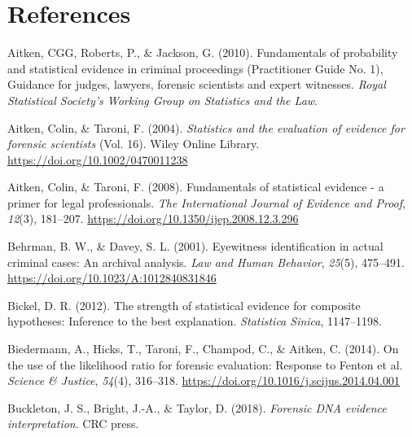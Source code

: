 \documentclass[
  letterpaper,
  DIV=11,
  numbers=noendperiod]{scrartcl}
\newlength{\cslhangindent}
\newlength{\cslentryspacingunit} %
\newenvironment{CSLReferences}[2] %
 {%
  \setlength{\parindent}{0pt}
  \ifodd #1
  \let\oldpar\par
  \def\par{\hangindent=\cslhangindent\oldpar}
  \fi
  \setlength{\parskip}{#2\cslentryspacingunit}
 }%
 {}
\begin{document}
\hypertarget{references}{%
\section*{References}\label{references}}

\hypertarget{refs}{}
\begin{CSLReferences}{1}{0}
\leavevmode{}%
Aitken, CGG, Roberts, P., \& Jackson, G. (2010). Fundamentals of
probability and statistical evidence in criminal proceedings
({P}ractitioner {G}uide {N}o. 1), {G}uidance for judges, lawyers,
forensic scientists and expert witnesses. \emph{Royal Statistical
Society's Working Group on Statistics and the Law}.

\leavevmode{}%
Aitken, Colin, \& Taroni, F. (2004). \emph{Statistics and the evaluation
of evidence for forensic scientists} (Vol. 16). Wiley Online Library.
\url{https://doi.org/10.1002/0470011238}

\leavevmode{}%
Aitken, Colin, \& Taroni, F. (2008). Fundamentals of statistical
evidence - a primer for legal professionals. \emph{The International
Journal of Evidence and Proof}, \emph{12}(3), 181--207.
\url{https://doi.org/10.1350/ijep.2008.12.3.296}

\leavevmode{}%
Behrman, B. W., \& Davey, S. L. (2001). Eyewitness identification in
actual criminal cases: {An} archival analysis. \emph{Law and Human
Behavior}, \emph{25}(5), 475--491.
\url{https://doi.org/10.1023/A:1012840831846}

\leavevmode{}%
Bickel, D. R. (2012). The strength of statistical evidence for composite
hypotheses: Inference to the best explanation. \emph{Statistica Sinica},
1147--1198.

\leavevmode{}%
Biedermann, A., Hicks, T., Taroni, F., Champod, C., \& Aitken, C.
(2014). On the use of the likelihood ratio for forensic evaluation:
{Response} to {Fenton} et al. \emph{Science \& Justice}, \emph{54}(4),
316--318. \url{https://doi.org/10.1016/j.scijus.2014.04.001}

\leavevmode{}%
Buckleton, J. S., Bright, J.-A., \& Taylor, D. (2018). \emph{Forensic
DNA evidence interpretation}. CRC press.


\end{CSLReferences}
\end{document}

